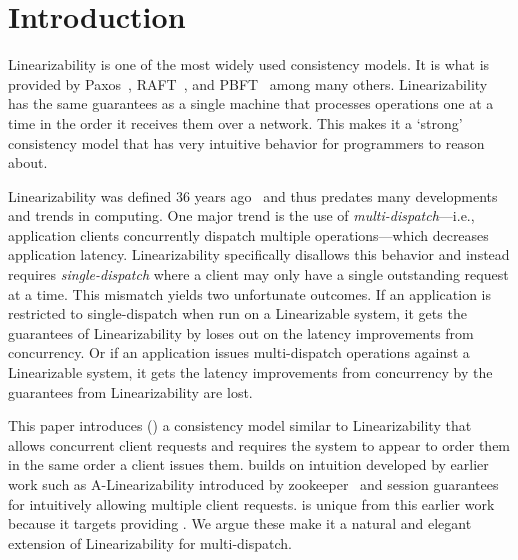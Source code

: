 \section{Introduction}
\label{sec:intro}




Linearizability is one of the most widely used consistency models.
It is what is provided by Paxos~\cite{paxos}, RAFT~\cite{raft}, and PBFT~\cite{pbft} among many others.
Linearizability has the same guarantees as a single machine that processes operations one at a time in the order it receives them over a network.
This makes it a `strong' consistency model that has very intuitive behavior for programmers to reason about.

Linearizability was defined 36 years ago~\cite{linearizability87, linearizability} and thus predates many developments and trends in computing.
One major trend is the use of \textit{multi-dispatch}---i.e., application clients concurrently dispatch multiple operations---which decreases application latency.
Linearizability specifically disallows this behavior and instead requires \textit{single-dispatch} where a client may only have a single outstanding request at a time.
This mismatch yields two unfortunate outcomes.
If an application is restricted to single-dispatch when run on a Linearizable system, it gets the guarantees of Linearizability by loses out on the latency improvements from concurrency.
Or if an application issues multi-dispatch operations against a Linearizable system, it gets the latency improvements from concurrency by the guarantees from Linearizability are lost.

This paper introduces \mdllong{} (\mdl) a consistency model similar to Linearizability that allows concurrent client requests and requires the system to appear to order them in the same order a client issues them.
\Mdl{} builds on intuition developed by earlier work such as A-Linearizability introduced by zookeeper~\cite{a-linearizability} and session guarantees~\cite{session-guarantees} for intuitively allowing multiple client requests.
\Mdl{} is unique from this earlier work because it targets providing .
We argue these make it a natural and elegant extension of Linearizability for multi-dispatch.

